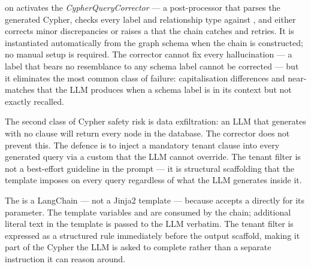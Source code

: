 on  activates the
\emph{CypherQueryCorrector} --- a post-processor that parses the generated
Cypher, checks every label and relationship type against
, and either corrects minor
discrepancies or raises a  that the
chain catches and retries. It is instantiated automatically from the graph
schema when the chain is constructed; no manual setup is required. The
corrector cannot fix every hallucination --- a label that bears no
resemblance to any schema label cannot be corrected --- but it eliminates
the most common class of failure: capitalisation differences and
near-matches that the LLM produces when a schema label is in its context
but not exactly recalled.

\begin{warningbox}
The second class of Cypher safety risk is data exfiltration: an LLM that
generates  with no  clause will
return every node in the database. The  corrector
does not prevent this. The defence is to inject a mandatory tenant
 clause into every generated query via a custom
 that the LLM cannot override. The tenant filter is
not a best-effort guideline in the prompt --- it is structural scaffolding
that the template imposes on every query regardless of what the LLM
generates inside it.
\end{warningbox}

The  is a LangChain  --- not a
Jinja2 template --- because  accepts
a  directly for its  parameter.
The template variables  and  are
consumed by the chain; additional literal text in the template is passed
to the LLM verbatim. The tenant filter is expressed as a structured rule
immediately before the output scaffold, making it part of the Cypher the
LLM is asked to complete rather than a separate instruction it can reason
around.


